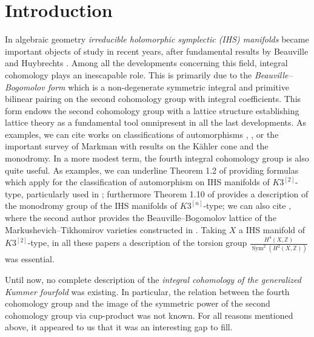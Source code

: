 \documentclass{alggeom}
\DeclareMathOperator{\Sym}{Sym}
\newcommand{\Z}{\mathbb{Z}}
\theoremstyle{plain}
\theoremstyle{definition}
\theoremstyle{remark}
\begin{document}
\section{Introduction}
In algebraic geometry \emph{irreducible holomorphic symplectic (IHS) manifolds} became important objects of study in recent years, after fundamental results by Beauville \cite{Beauville} and Huybrechts \cite{Huybrechts2}.
Among all the developments concerning this field, integral cohomology plays an inescapable role. 
This is primarily due to the \emph{Beauville--Bogomolov form} which is a non-degenerate symmetric integral and primitive bilinear pairing on the second cohomology group with integral coefficients. 
This form endows the second cohomology group with a lattice structure establishing lattice theory as a fundamental tool omnipresent in all the last developments. 
As examples, we can cite works on classifications of automorphisms \cite{Mongardi}, \cite{MongWanTari}, \cite{BCS} or the important survey of Markman \cite{Markmansurvey} with results on the K\"ahler cone and the monodromy. 
In a more modest term, the fourth integral cohomology group is also quite useful. As examples, we can underline Theorem 1.2 of \cite{BNS} providing formulas which apply for the classification of automorphism on IHS manifolds of $K3^{[2]}$-type, particularly used in \cite{BCS}; furthermore Theorem 1.10 of \cite{Markman2} provides a description of the monodromy group of the IHS manifolds of $K3^{[n]}$-type; we can also cite \cite{Lol2}, where the second author provides the Beauville--Bogomolov lattice of the Markushevich--Tikhomirov varieties constructed in \cite{Markou}. 
Taking $X$ a IHS manifold of $K3^{[2]}$-type, in all these papers a description of the torsion group $\frac{H^{4}(X,\Z)}{\Sym^2(H^{2}(X,\Z))}$ was essential.

Until now, no complete description of the \emph{integral cohomology of the generalized Kummer fourfold} was existing. In particular, the relation between the fourth cohomology group and the image of the symmetric power of the second cohomology group via cup-product was not known. For all reasons mentioned above, it appeared to us that it was an interesting gap to fill.
\end{document}
